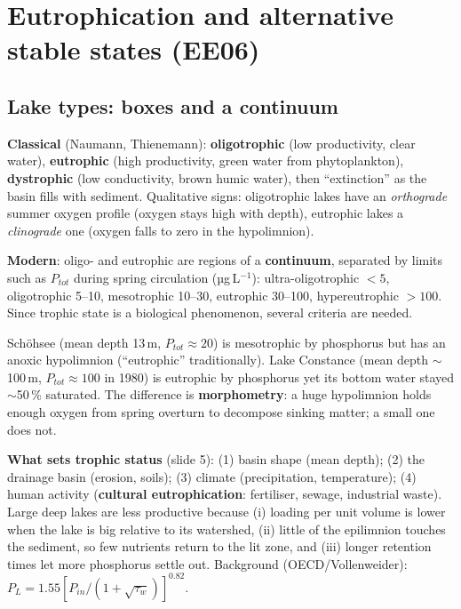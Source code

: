 \section{Eutrophication and alternative stable states (EE06)}

\subsection{Lake types: boxes and a continuum}
\textbf{Classical} (Naumann, Thienemann): \textbf{oligotrophic} (low productivity, clear water), \textbf{eutrophic}
(high productivity, green water from phytoplankton), \textbf{dystrophic} (low conductivity, brown humic water), then
``extinction'' as the basin fills with sediment. Qualitative signs: oligotrophic lakes have an \emph{orthograde} summer
oxygen profile (oxygen stays high with depth), eutrophic lakes a \emph{clinograde} one (oxygen falls to zero in the
hypolimnion).

\textbf{Modern}: oligo- and eutrophic are regions of a \textbf{continuum}, separated by limits such as $P_{tot}$ during
spring circulation (µg\,L$^{-1}$): ultra-oligotrophic $<5$, oligotrophic 5--10, mesotrophic 10--30, eutrophic 30--100,
hypereutrophic $>100$. Since trophic state is a biological phenomenon, several criteria are needed.

\begin{trap}
Schöhsee (mean depth 13\,m, $P_{tot}\approx20$) is mesotrophic by phosphorus but has an anoxic hypolimnion
(``eutrophic'' traditionally). Lake Constance (mean depth $\sim$100\,m, $P_{tot}\approx100$ in 1980) is eutrophic by
phosphorus yet its bottom water stayed $\sim$50\,\% saturated. The difference is \textbf{morphometry}: a huge hypolimnion
holds enough oxygen from spring overturn to decompose sinking matter; a small one does not.
\end{trap}

\textbf{What sets trophic status} (slide 5): (1) basin shape (mean depth); (2) the drainage basin (erosion, soils);
(3) climate (precipitation, temperature); (4) human activity (\textbf{cultural eutrophication}: fertiliser, sewage,
industrial waste). Large deep lakes are less productive because (i) loading per unit volume is lower when the lake is
big relative to its watershed, (ii) little of the epilimnion touches the sediment, so few nutrients return to the lit
zone, and (iii) longer retention times let more phosphorus settle out. Background (OECD/Vollenweider):
$P_L=1.55[P_{in}/(1+\sqrt{\tau_w})]^{0.82}$.

